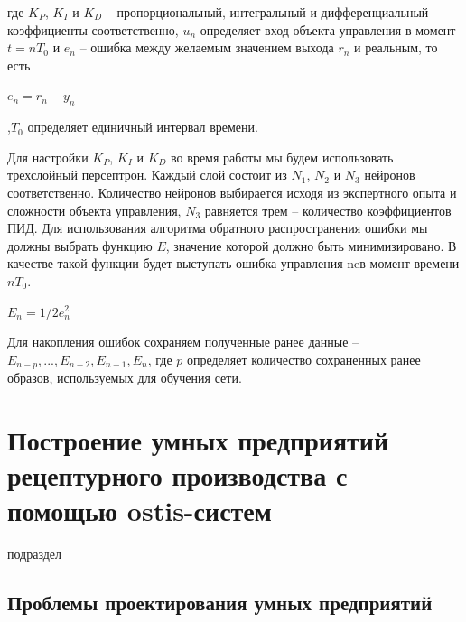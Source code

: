 где $K_P$, $K_I$ и $K_D$ – пропорциональный, интегральный и дифференциальный коэффициенты соответственно, $u_n$ определяет вход объекта управления в момент $t = nT_0$ и $e_n$ – ошибка между желаемым значением выхода $r_n$ и реальным, то есть 

$e_n = r_n - y_n $

,$T_0$ определяет единичный интервал времени. 

Для настройки $K_P$, $K_I$ и $K_D$ во время работы мы будем использовать  трехслойный  персептрон.  Каждый  слой  состоит  из $N_1$, $N_2$ и $N_3$ нейронов соответственно. Количество нейронов выбирается  исходя  из  экспертного  опыта  и  сложности  объекта  управления, $N_3$ равняется трем – количество коэффициентов ПИД. Для использования алгоритма обратного распространения ошибки мы должны выбрать функцию $E$, значение которой должно быть минимизировано. В качестве такой функции будет выступать ошибка управления neв момент времени $nT_0$.

$E_n = 1/2 e^2_n$ 

Для накопления ошибок сохраняем полученные ранее данные – $E_{n-p}, ..., E_{n-2},E_{n-1},E_n$,  где $p$  определяет  количество  сохраненных ранее образов, используемых для обучения сети.



\section{Построение умных предприятий рецептурного производства с помощью ostis-систем}
\label{sec_chapter_enterprise_smart_industry}

\begin{SCn}

\begin{scnrelfromlist}{подраздел}
\end{scnrelfromlist}

\end{SCn}


\subsection{Проблемы проектирования умных предприятий}
\label{sec_chapter_enterprise_smart_industry_problems}


